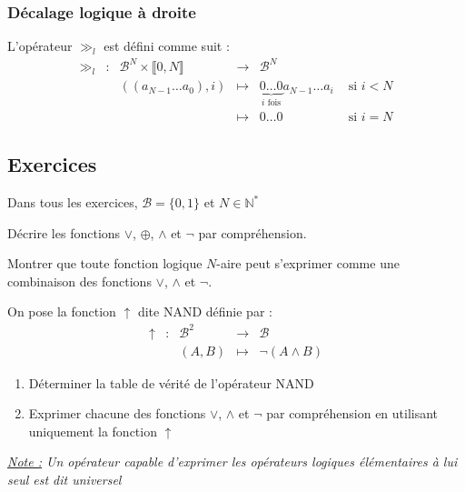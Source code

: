 \documentclass[../../main.tex]{subfiles}
\begin{document}
\subsubsection{Décalage logique à droite}
L'opérateur $\gg_{l}$ est défini comme suit :
$$
\begin{array}{lclcll}
\gg_{l} & : & \mathcal{B}^{N}\times{\llbracket0, N\rrbracket} & \rightarrow & \mathcal{B}^{N} \\
     &   & ((a_{N-1}\dots a_{0}), i) & \mapsto & \underbrace{0\dots 0}_{\text{$i$ fois}}a_{N-1}\dots a_{i} & \text{ si $i < N$} \\
     &   & & \mapsto & 0\dots 0 & \text{ si $i = N$}
\end{array}
$$
\subsection{Exercices}
Dans tous les exercices, $\mathcal{B} = \{0, 1\}$ et $N\in\mathbb{N}^{*}$

 Décrire les fonctions $\vee$, $\oplus$, $\wedge$ et $\neg$ par compréhension.

 Montrer que toute fonction logique $N$-aire peut s'exprimer comme une combinaison des fonctions $\vee$, $\wedge$ et $\neg$.

 On pose la fonction $\uparrow$ dite \og NAND \fg définie par :
$$
\begin{array}{lclcl}
\uparrow & : & \mathcal{B}^{2} & \rightarrow & \mathcal{B} \\
& & (A, B) & \mapsto & \neg{(A\wedge{B})}
\end{array}
$$
\begin{enumerate}
    \item Déterminer la table de vérité de l'opérateur NAND
    \item Exprimer chacune des fonctions $\vee$, $\wedge$ et $\neg$ par compréhension en utilisant uniquement la fonction $\uparrow$
\end{enumerate}
\textit{\underline{Note :} Un opérateur capable d'exprimer les opérateurs logiques élémentaires à lui seul est dit \og universel \fg}
\end{document}
